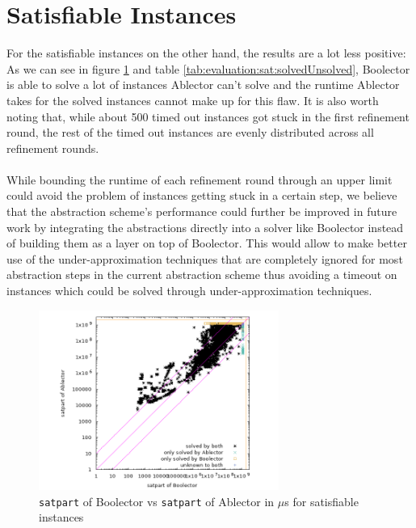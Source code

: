 
\section{Satisfiable Instances}
For the satisfiable instances on the other hand, the results are a lot less positive: As we can see in figure \ref{fig:evaluation:sat:scatter} and table \ref{tab:evaluation:sat:solvedUnsolved}, Boolector is able to solve a lot of instances Ablector can't solve and the runtime Ablector takes for the solved instances cannot make up for this flaw.
It is also worth noting that, while about 500 timed out instances got stuck in the first refinement round, the rest of the timed out instances are evenly distributed across all refinement rounds.
\paragraph{}
While bounding the runtime of each refinement round through an upper limit could avoid the problem of instances getting stuck in a certain step, we believe that the abstraction scheme's performance could further be improved in future work by integrating the abstractions directly into a solver like Boolector instead of building them as a layer on top of Boolector. This would allow to make better use of the under-approximation techniques that are completely ignored for most abstraction steps in the current abstraction scheme thus avoiding a timeout on instances which could be solved through under-approximation techniques.

\begin{figure}[]
    \centering
        \includegraphics[width=0.7\textwidth]{plots/sat/Boolector-vs-Ablector-satpart.png}
    \caption{\texttt{satpart} of Boolector vs \texttt{satpart} of Ablector in $\mu$s for satisfiable instances}
    \label{fig:evaluation:sat:scatter}
\end{figure}

